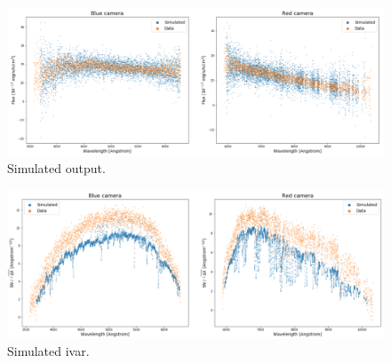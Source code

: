 \begin{figure}[h]
\centering
\includegraphics[width=17cm]{images/specsim/simulated_output_4055_55359_1.png}
\caption{Simulated output.}
\label{fig:simulated_flux}
\end{figure}

\begin{figure}[h]
\centering
\includegraphics[width=16cm]{images/specsim/ivar_4055_55359_1.png}
\caption{Simulated ivar.}
\label{fig:simulated_ivar}
\end{figure}

